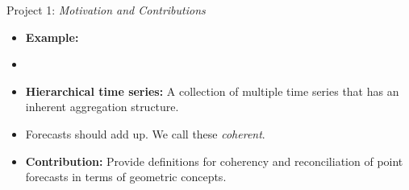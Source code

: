 \documentclass[11pt,xcolor=dvipsnames,table]{beamer} %
\begin{document}
\begin{frame}[noframenumbering]{Project 1: \textit{Motivation and Contributions}}
	\begin{itemize}[<+-| alert@+>]
			\item \textbf{Example:} 
			\begin{figure}

				\begin{center}
				
				\end{center}
			\end{figure}
		\item []
		
		\item \textbf{Hierarchical time series:} A collection of multiple time series that has an inherent aggregation structure. 
		\item Forecasts should add up. We call these \textit{coherent}.
		\item \textbf{\color{Maroon}Contribution:} Provide definitions for coherency and reconciliation of point forecasts in terms of geometric concepts.\\
		
		\end{itemize}
\end{frame}

\end{document}
